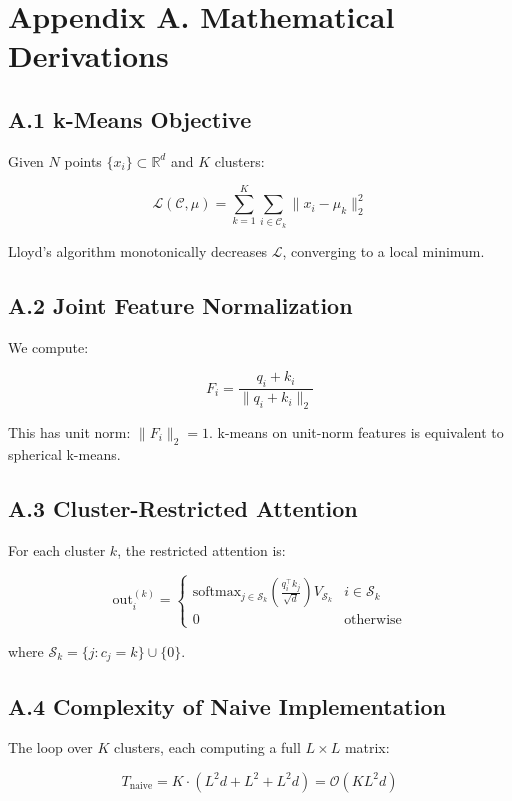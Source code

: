 
\section{Appendix A. Mathematical Derivations}

\subsection{A.1 k-Means Objective}

Given $N$ points $\{x_i\} \subset \mathbb{R}^d$ and $K$ clusters:

\[
\mathcal{L}(\mathcal{C}, \mu) = \sum_{k=1}^{K} \sum_{i \in \mathcal{C}_k} \|x_i - \mu_k\|_2^2
\tag{A.1}
\]

Lloyd's algorithm monotonically decreases $\mathcal{L}$, converging to a 
local minimum.

\subsection{A.2 Joint Feature Normalization}

We compute:

\[
F_i = \frac{q_i + k_i}{\|q_i + k_i\|_2}
\tag{A.2}
\]

This has unit norm: $\|F_i\|_2 = 1$. k-means on unit-norm features is 
equivalent to spherical k-means.

\subsection{A.3 Cluster-Restricted Attention}

For each cluster $k$, the restricted attention is:

\[
\text{out}_i^{(k)} = \begin{cases} 
\text{softmax}_{j \in \mathcal{S}_k}\!\left(\frac{q_i^\top k_j}{\sqrt{d}}\right) V_{\mathcal{S}_k} & i \in \mathcal{S}_k \\
0 & \text{otherwise}
\end{cases}
\tag{A.3}
\]

where $\mathcal{S}_k = \{j : c_j = k\} \cup \{0\}$.

\subsection{A.4 Complexity of Naive Implementation}

The loop over $K$ clusters, each computing a full $L \times L$ matrix:

\[
T_\text{naive} = K \cdot \left( L^2 d + L^2 + L^2 d \right) = \mathcal{O}(K L^2 d)
\tag{A.4}
\]

